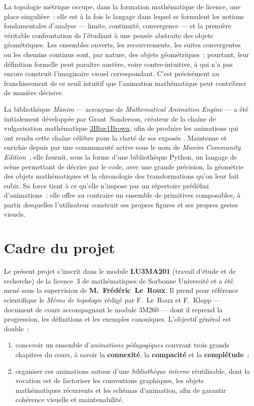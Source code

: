 \documentclass[12pt, a4paper, openany]{report}
\begin{document}
	La topologie métrique occupe, dans la formation mathématique de licence, une place singulière~: elle est à la fois le langage dans lequel se formulent les notions fondamentales d’analyse — limite, continuité, convergence — et la première véritable confrontation de l’étudiant à une pensée abstraite des objets géométriques. Les ensembles ouverts, les recouvrements, les suites convergentes ou les chemins continus sont, par nature, des objets géométriques~; pourtant, leur définition formelle peut paraître austère, voire contre-intuitive, à qui n’a pas encore construit l’imaginaire visuel correspondant. C’est précisément au franchissement de ce seuil intuitif que l’animation mathématique peut contribuer de manière décisive.

	La bibliothèque \textit{Manim} — acronyme de \textit{Mathematical Animation Engine} — a été initialement développée par Grant~Sanderson, créateur de la chaîne de vulgarisation mathématique \href{https://www.youtube.com/3Blue1Brown}{3Blue1Brown}, afin de produire les animations qui ont rendu cette chaîne célèbre pour la clarté de ses exposés \cite{sanderson}. Maintenue et enrichie depuis par une communauté active sous le nom de \textit{Manim Community Edition}~\cite{manim}, elle fournit, sous la forme d’une bibliothèque Python, un langage de scène permettant de décrire par le code, avec une grande précision, la géométrie des objets mathématiques et la chronologie des transformations qu’on leur fait subir. Sa force tient à ce qu’elle n’impose pas un répertoire prédéfini d’animations~: elle offre au contraire un ensemble de primitives composables, à partir desquelles l’utilisateur construit ses propres figures et ses propres gestes visuels.

	\section{Cadre du projet}

	Le présent projet s’inscrit dans le module \textbf{LU3MA201} (travail d’étude et de recherche) de la licence~3 de mathématiques de Sorbonne Université et a été mené sous la supervision de \textbf{M.~Frédéric~Le~Roux}. Il prend pour référence scientifique le \textit{Mémo de topologie} rédigé par F.~Le~Roux et F.~Klopp \cite{lerouxklopp} — document de cours accompagnant le module 3M260 — dont il reprend la progression, les définitions et les exemples canoniques. L’objectif général est double~:

	\begin{enumerate}
		\item concevoir un ensemble d’\emph{animations pédagogiques} couvrant trois grands chapitres du cours, à savoir la \textbf{connexité}, la \textbf{compacité} et la \textbf{complétude}~;
		\item organiser ces animations autour d’une \emph{bibliothèque interne} réutilisable, dont la vocation est de factoriser les conventions graphiques, les objets mathématiques récurrents et les schémas d’animation, afin de garantir cohérence visuelle et maintenabilité.
	\end{enumerate}
\end{document}
